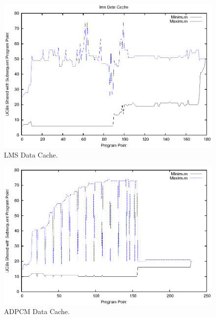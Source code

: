 \begin{figure}[h!]
\vspace{-10pt}
\begin{center}
\includegraphics[width=\linewidth]{eps/lms-dcache.eps}
\caption{LMS Data Cache.}
\label{fig:lms_data_cache}
\end{center}
\vspace{-15pt}
\end{figure}
\begin{figure}[h!]
\vspace{-15pt}
\begin{center}
\includegraphics[width=\linewidth]{eps/adpcm-dcache.eps}
\caption{ADPCM Data Cache.}
\label{fig:adpcm_data_cache}
\end{center}
\vspace{-10pt}
\end{figure}
